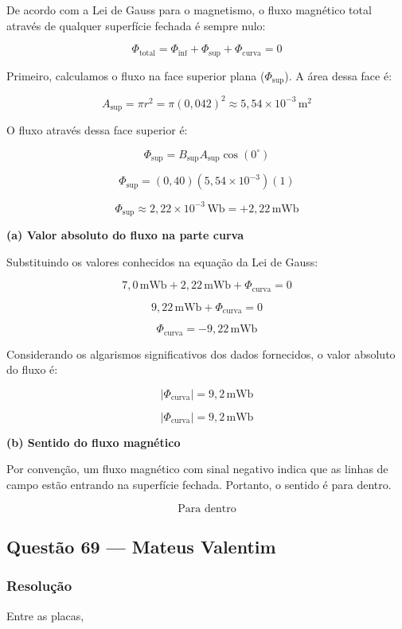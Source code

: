 \documentclass[12pt,a4paper]{article}
\begin{document}
De acordo com a Lei de Gauss para o magnetismo, o fluxo magnético total através de qualquer superfície fechada é sempre nulo:

\[
\Phi_{\text{total}} = \Phi_{\text{inf}} + \Phi_{\text{sup}} + \Phi_{\text{curva}} = 0
\]

Primeiro, calculamos o fluxo na face superior plana (\(\Phi_{\text{sup}}\)). A área dessa face é:

\[
A_{\text{sup}} = \pi r^2 = \pi (0,042)^2 \approx 5,54 \times 10^{-3}\,\text{m}^2
\]

O fluxo através dessa face superior é:

\[
\Phi_{\text{sup}} = B_{\text{sup}} A_{\text{sup}} \cos(0^\circ)
\]

\[
\Phi_{\text{sup}} = (0,40)(5,54 \times 10^{-3})(1)
\]

\[
\Phi_{\text{sup}} \approx 2,22 \times 10^{-3}\,\text{Wb} = +2,22\,\text{mWb}
\]

\textbf{(a) Valor absoluto do fluxo na parte curva}

Substituindo os valores conhecidos na equação da Lei de Gauss:

\[
7,0\,\text{mWb} + 2,22\,\text{mWb} + \Phi_{\text{curva}} = 0
\]

\[
9,22\,\text{mWb} + \Phi_{\text{curva}} = 0
\]

\[
\Phi_{\text{curva}} = -9,22\,\text{mWb}
\]

Considerando os algarismos significativos dos dados fornecidos, o valor absoluto do fluxo é:

\[
|\Phi_{\text{curva}}| = 9,2\,\text{mWb}
\]

\[
\boxed{|\Phi_{\text{curva}}| = 9,2\,\text{mWb}}
\]

\textbf{(b) Sentido do fluxo magnético}

Por convenção, um fluxo magnético com sinal negativo indica que as linhas de campo estão entrando na superfície fechada. Portanto, o sentido é para dentro.

\[
\boxed{\text{Para dentro}}
\]

\subsection{Questão 69 — Mateus Valentim}
\subsubsection{Resolução}

Entre as placas,
\end{document}
